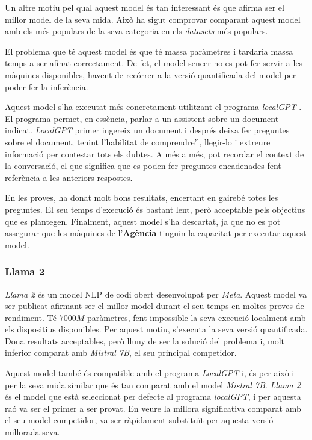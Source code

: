 Un altre motiu pel qual aquest model és tan interessant és que afirma ser el millor model de la seva mida. Això ha sigut comprovar comparant aquest model amb els més populars de la seva categoria en els \textit{datasets} més populars.

El problema que té aquest model és que té massa paràmetres i tardaria massa temps a ser afinat correctament. De fet, el model sencer no es pot fer servir a les màquines disponibles, havent de recórrer a la versió quantificada del model per poder fer la inferència. 

Aquest model s'ha executat més concretament utilitzant el programa \textit{localGPT} \cite{localgpt}. El programa permet, en essència, parlar a un assistent sobre un document indicat. \textit{LocalGPT} primer ingereix un document i després deixa fer preguntes sobre el document, tenint l'habilitat de comprendre'l, llegir-lo i extreure informació per contestar tots els dubtes. A més a més, pot recordar el context de la conversació, el que significa que es poden fer preguntes encadenades fent referència a les anteriors respostes.

En les proves, ha donat molt bons resultats, encertant en gairebé totes les preguntes. El seu temps d'execució és bastant lent, però acceptable pels objectius que es plantegen. Finalment, aquest model s'ha descartat, ja que no es pot assegurar que les màquines de l'\textbf{Agència} tinguin la capacitat per executar aquest model.


\subsubsection{Llama 2}
\textit{Llama 2} \cite{llama} és un model NLP de codi obert desenvolupat per \textit{Meta}. Aquest model va ser publicat afirmant ser el millor model durant el seu temps en moltes proves de rendiment. Té $7000M$ paràmetres, fent impossible la seva execució localment amb els dispositius disponibles. Per aquest motiu, s'executa la seva versió quantificada. Dona resultats acceptables, però lluny de ser la solució del problema i, molt inferior comparat amb \textit{Mistral 7B}, el seu principal competidor.

Aquest model també és compatible amb el programa \textit{LocalGPT} \cite{localgpt} i, és per això i per la seva mida similar que és tan comparat amb el model \textit{Mistral 7B}. \textit{Llama 2} és el model que està seleccionat per defecte al programa \textit{localGPT}, i per aquesta raó va ser el primer a ser provat. En veure la millora significativa comparat amb el seu model competidor, va ser ràpidament substituït per aquesta versió millorada seva.



